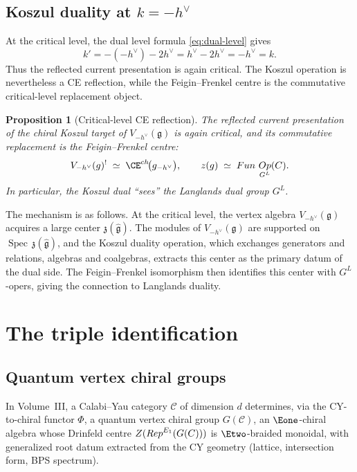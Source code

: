 \documentclass[11pt]{article}
\newtheorem{proposition}[theorem]{Proposition}
\theoremstyle{definition}
\theoremstyle{remark}
\DeclareMathOperator{\Rep}{Rep}
\DeclareMathOperator{\Spec}{Spec}
\DeclareMathOperator{\Op}{Op}
\newcommand{\g}{\mathfrak{g}}
\newcommand{\hv}{h^\vee}
\begin{document}
\subsection{Koszul duality at $k = -\hv$}

At the critical level, the dual level formula \eqref{eq:dual-level} gives
\[
 k' = -(-\hv) - 2\hv = \hv - 2\hv = -\hv = k.
\]
Thus the reflected current presentation is again critical.  The Koszul
operation is nevertheless a CE reflection, while the Feigin--Frenkel
centre is the commutative critical-level replacement object.

\begin{proposition}[Critical-level CE reflection]
\label{prop:koszul-critical}
The reflected current presentation of the chiral Koszul target of
$V_{-\hv}(\g)$ is again critical, and its commutative replacement is the
Feigin--Frenkel centre:
\[
 V_{-\hv}(\g)^!
 \;\simeq\;
 \CE^{\mathrm{ch}}\!\bigl(\widehat{\g}_{-\hv}\bigr),
 \qquad
 \mathfrak{z}(\hat{\g})
 \;\simeq\;
 \mathrm{Fun}\,\Op_{G^L}(C).
\]
In particular, the Koszul dual ``sees'' the Langlands dual group $G^L$.
\end{proposition}

The mechanism is as follows. At the critical level, the vertex algebra
$V_{-\hv}(\g)$ acquires a large center $\mathfrak{z}(\hat{\g})$. The modules
of $V_{-\hv}(\g)$ are supported on $\Spec\,\mathfrak{z}(\hat{\g})$, and the
Koszul duality operation, which exchanges generators and relations, algebras
and coalgebras, extracts this center as the primary datum of the dual side.
The Feigin--Frenkel isomorphism then identifies this center with $G^L$-opers,
giving the connection to Langlands duality.


\section{The triple identification}
\label{sec:triple}

\subsection{Quantum vertex chiral groups}

In Volume~III, a Calabi--Yau category $\mathcal{C}$ of dimension $d$
determines, via the CY-to-chiral functor $\Phi$, a quantum vertex chiral group
$G(\mathcal{C})$, an $\Eone$-chiral algebra whose Drinfeld centre
$\cZ(\Rep^{E_1}(G(\cC)))$ is $\Etwo$-braided monoidal, with generalized
root datum extracted from the CY geometry (lattice, intersection form,
BPS spectrum).
\end{document}
